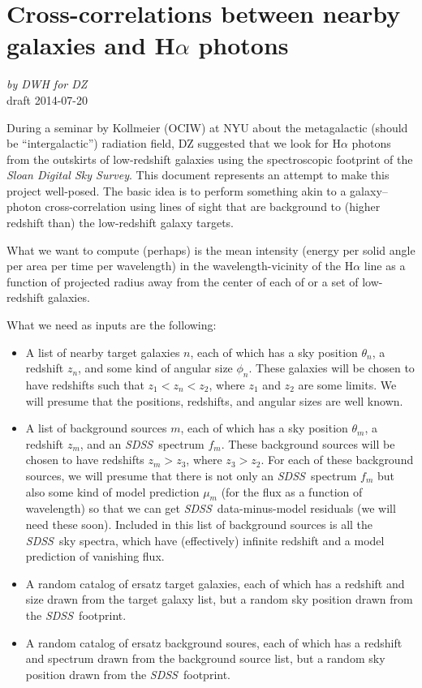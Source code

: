 \documentclass[12pt, letterpaper]{article}
\newcommand{\project}[1]{\textsl{#1}}
\newcommand{\SDSS}{\project{SDSS}}
\begin{document}
\section*{Cross-correlations between nearby galaxies and H$\alpha$ photons}

\noindent
\textsl{by DWH for DZ}\\
draft 2014-07-20

\bigskip

During a seminar by Kollmeier (OCIW) at NYU about the metagalactic
(should be ``intergalactic'') radiation field, DZ suggested that we
look for H$\alpha$ photons from the outskirts of low-redshift galaxies
using the spectroscopic footprint of the \project{Sloan Digital Sky
  Survey}.
This document represents an attempt to make this project well-posed.
The basic idea is to perform something akin to a galaxy--photon
cross-correlation using lines of sight that are background to (higher
redshift than) the low-redshift galaxy targets.

What we want to compute (perhaps) is the mean intensity (energy per
solid angle per area per time per wavelength) in the
wavelength-vicinity of the H$\alpha$ line as a function of projected
radius away from the center of each of or a set of low-redshift
galaxies.

What we need as inputs are the following:
\begin{itemize}
\item
A list of nearby target galaxies $n$, each of which has a sky position
$\theta_n$, a redshift $z_n$, and some kind of angular size $\phi_n$.
These galaxies will be chosen to have redshifts such that $z_1 < z_n <
z_2$, where $z_1$ and $z_2$ are some limits.  We will presume that the
positions, redshifts, and angular sizes are well known.
\item
A list of background sources $m$, each of which has a sky position
$\theta_m$, a redshift $z_m$, and an \SDSS\ spectrum $f_m$.  These
background sources will be chosen to have redshifts $z_m > z_3$, where
$z_3 > z_2$.  For each of these background sources, we will presume
that there is not only an \SDSS\ spectrum $f_m$ but also some kind of
model prediction $\mu_m$ (for the flux as a function of wavelength) so
that we can get \SDSS\ data-minus-model residuals (we will need these
soon).  Included in this list of background sources is all the
\SDSS\ sky spectra, which have (effectively) infinite redshift and a
model prediction of vanishing flux.
\item
A random catalog of ersatz target galaxies, each of which has a
redshift and size drawn from the target galaxy list, but a random sky
position drawn from the \SDSS\ footprint.
\item
A random catalog of ersatz background soures, each of which has a
redshift and spectrum drawn from the background source list, but a
random sky position drawn from the \SDSS\ footprint.
\end{itemize}
\end{document}
